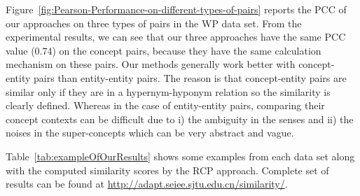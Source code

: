 Figure~\ref{fig:Pearson-Performance-on-different-types-of-pairs}
reports the PCC of our approaches on three types
of pairs in the WP data set.
From the experimental results, we can see that our three approaches have
the same PCC value (0.74) on the concept pairs,
because they have the same calculation mechanism on these pairs.
Our methods generally work better with concept-entity pairs
than entity-entity pairs. The reason is that concept-entity pairs
are similar only if they are in a hypernym-hyponym relation so the
similarity is clearly defined. Whereas in the case of entity-entity
pairs, comparing their concept contexts can be difficult due to
i) the ambiguity in the senses and ii) the noises in the super-concepts
which can be very abstract and vague. %

Table~\ref{tab:exampleOfOurResults} shows some examples from each data set
along with the computed similarity scores by the RCP approach.
Complete set of results can be found at \url{http://adapt.seiee.sjtu.edu.cn/similarity/}.


